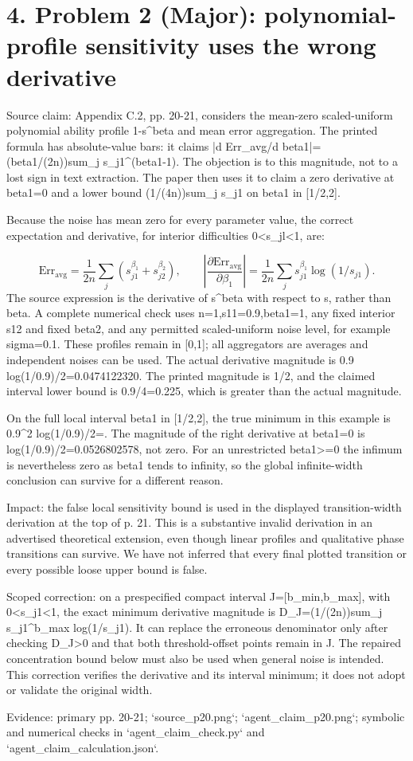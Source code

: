 \documentclass[10pt]{article}
\begin{document}
\section*{4. Problem 2 (Major): polynomial-profile sensitivity uses the wrong derivative}
Source claim: Appendix C.2, pp. 20-21, considers the mean-zero scaled-uniform polynomial ability profile 1-s\textasciicircum{}beta and mean error aggregation. The printed formula has absolute-value bars: it claims |d Err\_avg/d beta1|=(beta1/(2n))sum\_j s\_j1\textasciicircum{}(beta1-1). The objection is to this magnitude, not to a lost sign in text extraction. The paper then uses it to claim a zero derivative at beta1=0 and a lower bound (1/(4n))sum\_j s\_j1 on beta1 in [1/2,2].\par
Because the noise has mean zero for every parameter value, the correct expectation and derivative, for interior difficulties 0<s\_jl<1, are:\par
\[\mathrm{Err}_{\mathrm{avg}}=\frac1{2n}\sum_j(s_{j1}^{\beta_1}+s_{j2}^{\beta_2}),\qquad\left|\frac{\partial\mathrm{Err}_{\mathrm{avg}}}{\partial\beta_1}\right|=\frac1{2n}\sum_j s_{j1}^{\beta_1}\log(1/s_{j1}).\] The source expression is the derivative of s\textasciicircum{}beta with respect to s, rather than beta. A complete numerical check uses n=1,s11=0.9,beta1=1, any fixed interior s12 and fixed beta2, and any permitted scaled-uniform noise level, for example sigma=0.1. These profiles remain in [0,1]; all aggregators are averages and independent noises can be used. The actual derivative magnitude is 0.9 log(1/0.9)/2=0.0474122320. The printed magnitude is 1/2, and the claimed interval lower bound is 0.9/4=0.225, which is greater than the actual magnitude.\par
On the full local interval beta1 in [1/2,2], the true minimum in this example is 0.9\textasciicircum{}2 log(1/0.9)/2=. The magnitude of the right derivative at beta1=0 is log(1/0.9)/2=0.0526802578, not zero. For an unrestricted beta1>=0 the infimum is nevertheless zero as beta1 tends to infinity, so the global infinite-width conclusion can survive for a different reason.\par
Impact: the false local sensitivity bound is used in the displayed transition-width derivation at the top of p. 21. This is a substantive invalid derivation in an advertised theoretical extension, even though linear profiles and qualitative phase transitions can survive. We have not inferred that every final plotted transition or every possible loose upper bound is false.\par
Scoped correction: on a prespecified compact interval J=[b\_min,b\_max], with 0<s\_j1<1, the exact minimum derivative magnitude is D\_J=(1/(2n))sum\_j s\_j1\textasciicircum{}b\_max log(1/s\_j1). It can replace the erroneous denominator only after checking D\_J>0 and that both threshold-offset points remain in J. The repaired concentration bound below must also be used when general noise is intended. This correction verifies the derivative and its interval minimum; it does not adopt or validate the original width.\par
Evidence: primary pp. 20-21; `source\_p20.png`; `agent\_claim\_p20.png`; symbolic and numerical checks in `agent\_claim\_check.py` and `agent\_claim\_calculation.json`.\par
\end{document}
